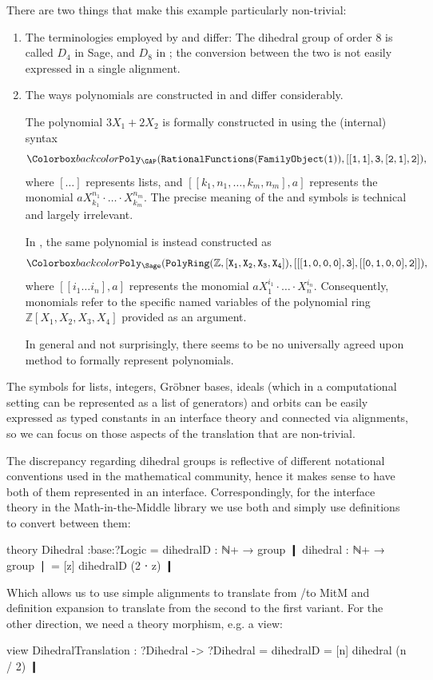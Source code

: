 There are two things that make this example particularly non-trivial:
\begin{enumerate}
	\item The terminologies employed by \GAP and \Sage differ: The dihedral group of order 8 is called $D_4$ in Sage, and $D_8$ in \GAP; the conversion between the two is not easily expressed in a single alignment.
	\item The ways polynomials are constructed in \GAP and \Sage differ considerably. 
	
	The polynomial $3X_1+2X_2$ is formally constructed in \GAP using the (internal) syntax
		\[\expr{ Poly_{\GAP}(RationalFunctions(FamilyObject(1)),[[1,1],3,[2,1],2])},\]
		where $[\ldots]$ represents lists, and $[[k_1,n_1,\ldots,k_m,n_m],a]$ represents the monomial $aX_{k_1}^{n_1}\cdot\ldots\cdot X_{k_m}^{n_m}$. The precise meaning of the  and  symbols is technical and largely irrelevant.
		
		In \Sage, the same polynomial is instead constructed as 
		\[ \expr{ Poly_{\Sage}(PolyRing(\mathbb Z,[X_1,X_2,X_3,X_4]),[[[1,0,0,0],3],[[0,1,0,0],2]])}, \]
		where $[[i_1\ldots i_n],a]$ represents the monomial $aX_1^{i_1}\cdot\ldots\cdot X_n^{i_n}$. Consequently, monomials refer to the specific named variables of the polynomial ring $\mathbb Z[X_1,X_2,X_3,X_4]$ provided as an argument.
		
		In general and not surprisingly, there seems to be no universally agreed upon method to formally represent polynomials. 
\end{enumerate}

The symbols for lists, integers, Gröbner bases, ideals (which in a computational setting can be represented as a list of generators) and orbits can be easily expressed as typed constants in an interface theory and connected via alignments, so we can focus on those aspects of the translation that are non-trivial.

The discrepancy regarding dihedral groups is reflective of different notational conventions used in the mathematical community, hence it makes sense to have both of them represented in an interface. Correspondingly, for the interface theory in the Math-in-the-Middle library we use both and simply use definitions to convert between them:

\begin{mmtcode}[caption= {An Interface Theory for Dihedral Groups},label=fig:crosslib:dihedraltheory]
theory Dihedral :base:?Logic =
	dihedralD 	: ℕ+ → group ❙
	dihedral 	: ℕ+ → group ❘ = [z] dihedralD (2 ⋅ z) ❙
\end{mmtcode}
Which allows us to use simple alignments to translate from \GAP/\Sage to MitM and definition expansion to translate from the second to the first variant. For the other direction, we need a theory morphism, e.g. a view:
\begin{mmtcode}[caption= {An View for Translating Dihedral Groups},label=fig:crosslib:dihedralview]
view DihedralTranslation : ?Dihedral -> ?Dihedral =
	dihedralD = [n] dihedral (n / 2) ❙
\end{mmtcode}

